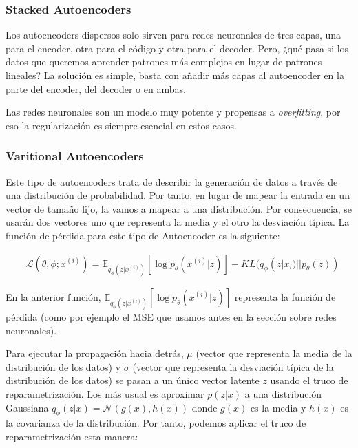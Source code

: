 \subsubsection{Stacked Autoencoders}

Los autoencoders dispersos solo sirven para redes neuronales de tres capas, una para el encoder, otra para el código y otra para el decoder. Pero, ¿qué pasa si los datos que queremos aprender patrones más complejos en lugar de patrones lineales? La solución es simple, basta con añadir más capas al autoencoder en la parte del encoder, del decoder o en ambas.\newline

Las redes neuronales son un modelo muy potente y propensas a \textit{overfitting}, por eso la regularización es siempre esencial en estos casos.

\subsubsection{Varitional Autoencoders}

Este tipo de autoencoders trata de describir la generación de datos a través de una distribución de probabilidad. Por tanto, en lugar de mapear la entrada en un vector de tamaño fijo, la vamos a mapear a una distribución. Por consecuencia, se usarán dos vectores uno que representa la media y el otro la desviación típica. La función de pérdida para este tipo de Autoencoder es la siguiente:

\begin{align}
	&\mathcal{L}(\theta, \phi; x^{(i)}) = \mathbb{E}_{q_\phi(z|x^{(i)})} \left[ \log p_\theta(x^{(i)}|z) \right] - KL(q_\phi(z|x_i)||p_\theta(z))
\end{align}

En la anterior función, $\mathbb{E}_{q_\phi(z|x^{(i)})} \left[ \log p_\theta(x^{(i)}|z) \right]$ representa la función de pérdida (como por ejemplo el MSE que usamos antes en la sección sobre redes neuronales).\newline

Para ejecutar la propagación hacia detrás, $\mu$ (vector que representa la media de la distribución de los datos) y $\sigma$ (vector que representa la desviación típica de la distribución de los datos) se pasan a un único vector latente $z$ usando el truco de reparametrización. Los más usual es aproximar $p(z|x)$ a una distribución Gaussiana $q_\phi(z|x) = \mathcal{N}(g(x),h(x))$ donde $g(x)$ es la media y $h(x)$ es la covarianza de la distribución. Por tanto, podemos aplicar el truco de reparametrización esta manera:


